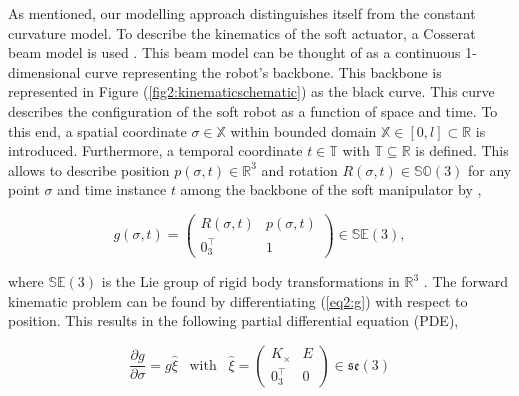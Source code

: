 As mentioned, our modelling approach distinguishes itself from the constant curvature model. To describe the kinematics of the soft actuator, a Cosserat beam model is used \cite{Boyer2019}. This beam model can be thought of as a continuous 1-dimensional curve representing the robot's backbone. This backbone is represented in Figure (\ref{fig2:kinematicschematic}) as the black curve. This curve describes the configuration of the soft robot as a function of space and time. To this end, a spatial coordinate  $\sigma \in \mathbb{X}$ within bounded domain $\mathbb{X} \in [0,l] \subset \mathbb{R}$ is introduced. Furthermore, a temporal coordinate $t \in  \mathbb{T}$ with $\mathbb{T} \subseteq \mathbb{R}$ is defined. This allows to describe position $p(\sigma,t) \in \mathbb{R}^3$ and rotation $R(\sigma,t) \in \mathbb{SO}(3)$ for any point $\sigma$ and time instance $t$ among the backbone of the soft manipulator by \cite{Caasenbrood2020},


\begin{equation}
    g(\sigma,t) = \begin{pmatrix}  R(\sigma,t) & p(\sigma,t) \\ 0_3^\top & 1 \end{pmatrix} \in \mathbb{SE}(3),
    \label{eq2:g}
\end{equation}

where $\mathbb{SE}(3)$ is the Lie group of rigid body transformations in $\mathbb{R}^3$ \cite{Sola2018}. The forward kinematic problem can be found by differentiating (\ref{eq2:g}) with respect to position. This results in the following partial differential equation (PDE), 


\begin{equation}
    \frac{\partial g}{\partial \sigma} = g \hat{\xi} \hspace{10pt} \text{with} \hspace{10pt}  \hat{\xi} = \begin{pmatrix} K_\times & E \\ 0_3^\top & 0 \end{pmatrix} \in  \mathfrak{se}(3)
    \label{eq2:dgdsigma}
\end{equation}

